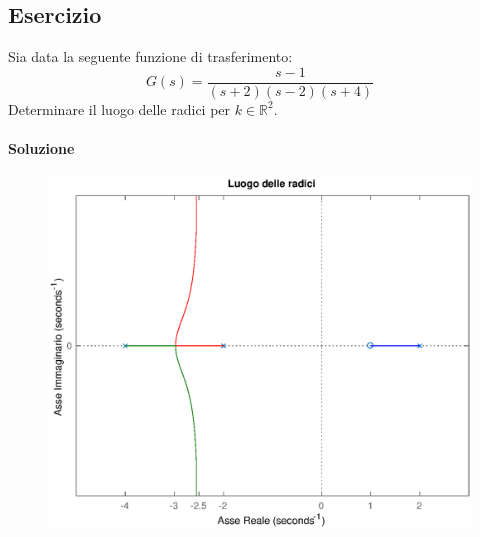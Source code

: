 \subsection{Esercizio}
Sia data la seguente funzione di trasferimento:
\[
	G(s) = \frac{s-1}{(s+2)(s-2)(s+4)}
\]
Determinare il luogo delle radici per \(k\in\mathbb{R}^2\).

\paragraph{Soluzione}

\begin{figure}[ht]
	\centering
	\includegraphics[scale=.6]{mod1/assets/rl_ex39}
\end{figure}

